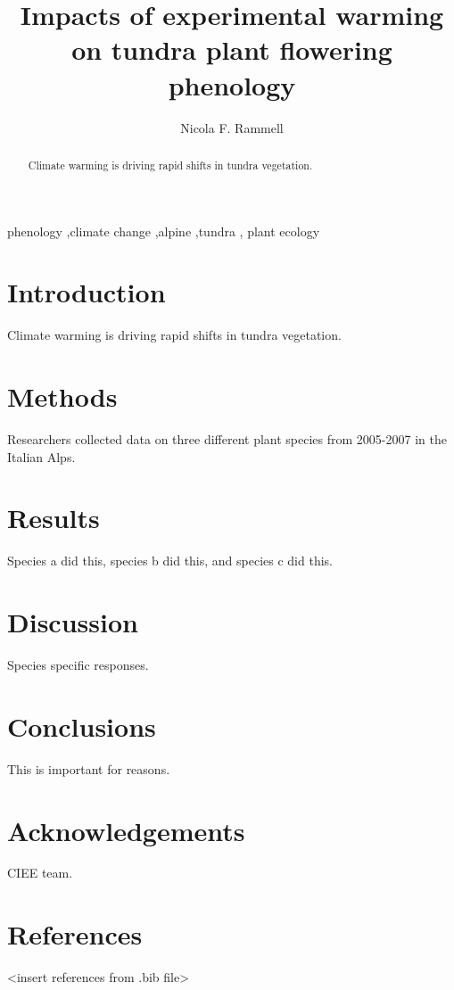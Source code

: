 \documentclass[preprint, 3p,
authoryear]{elsarticle} %
\begin{document}
\begin{frontmatter}

  \title{Impacts of experimental warming on tundra plant flowering
phenology}
    \author[The University of British Columbia]{Nicola F. Rammell%
  }
  
  \begin{abstract}
  Climate warming is driving rapid shifts in tundra vegetation.
  \end{abstract}
    \begin{keyword}
    phenology \sep climate change \sep alpine \sep tundra \sep 
    plant ecology
  \end{keyword}
  
 \end{frontmatter}

\hypertarget{introduction}{%
\section{Introduction}\label{introduction}}

Climate warming is driving rapid shifts in tundra vegetation.

\hypertarget{methods}{%
\section{Methods}\label{methods}}

Researchers collected data on three different plant species from
2005-2007 in the Italian Alps.

\hypertarget{results}{%
\section{Results}\label{results}}

Species a did this, species b did this, and species c did this.

\hypertarget{discussion}{%
\section{Discussion}\label{discussion}}

Species specific responses.

\hypertarget{conclusions}{%
\section{Conclusions}\label{conclusions}}

This is important for reasons.

\hypertarget{acknowledgements}{%
\section{Acknowledgements}\label{acknowledgements}}

CIEE team.

\hypertarget{references}{%
\section{References}\label{references}}

\textless insert references from .bib file\textgreater{}


\end{document}
